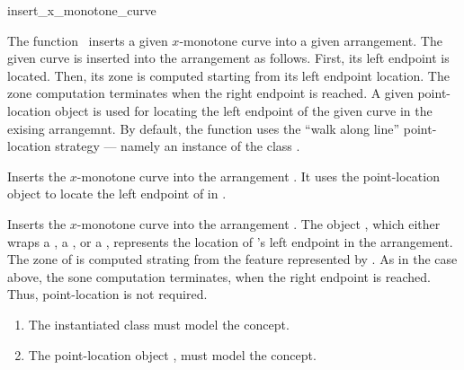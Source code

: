 \ccRefPageBegin

\begin{ccRefFunction}{insert_x_monotone_curve}

\ccDefinition

The function \ccRefName\ inserts a given $x$-monotone curve into a
given arrangement. The given curve is inserted into the arrangement as
follows. First, its left endpoint is located. Then, its zone is computed
starting from its left endpoint location. The zone computation terminates
when the right endpoint is reached. A given point-location object is used
for locating the left endpoint of the given curve in the exising
arrangemnt. By default, the function uses the ``walk along line''
point-location strategy --- namely an instance of the class
.


Inserts the $x$-monotone curve  into the arrangement . It
uses the point-location object  to locate the left endpoint of
 in .


Inserts the $x$-monotone curve  into the arrangement . 
The object , which either wraps a , a
, or a , represents the
location of 's left endpoint in the arrangement. The zone of
 is computed strating from the feature represented by .
As in the case above, the sone computation terminates, when the right
endpoint is reached.  Thus, point-location is not required.

\ccRequirements
\begin{enumerate}
\item The instantiated  class must model the
   concept.
\item The point-location object , must model the
   concept.
\end{enumerate}
			 
\end{ccRefFunction}

\ccRefPageEnd
